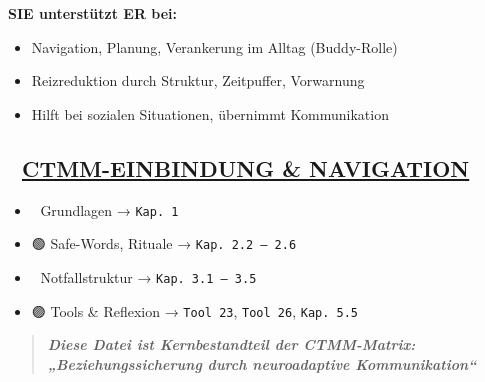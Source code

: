 \textbf{SIE unterstützt ER bei:}

\begin{itemize}
\tightlist
\item
  Navigation, Planung, Verankerung im Alltag (Buddy-Rolle)
\item
  Reizreduktion durch Struktur, Zeitpuffer, Vorwarnung
\item
  Hilft bei sozialen Situationen, übernimmt Kommunikation
\end{itemize}

\hypertarget{ctmm-einbindung-navigation}{%
\subsection{\texorpdfstring{🧭 \textbf{\ul{CTMM-EINBINDUNG \& NAVIGATION}}}{🧭 CTMM-EINBINDUNG \& NAVIGATION}}\label{ctmm-einbindung-navigation}}

\begin{itemize}
\tightlist
\item
  🔵 Grundlagen → \texttt{Kap.\ }\texttt{1}
\item
  🟢 Safe-Words, Rituale → \texttt{Kap.\ }\texttt{2.2\ –\ 2.6}
\item
  🔴 Notfallstruktur → \texttt{Kap.\ }\texttt{3.1\ –\ 3.5}
\item
  🟣 Tools \& Reflexion → \texttt{Tool\ 23}, \texttt{Tool\ 26}, \texttt{Kap.\ }\texttt{5.5}
\end{itemize}

\begin{quote}
\emph{\textbf{Diese Datei ist Kernbestandteil der CTMM-Matrix: „Beziehungssicherung durch neuroadaptive Kommunikation``}}
\end{quote}


